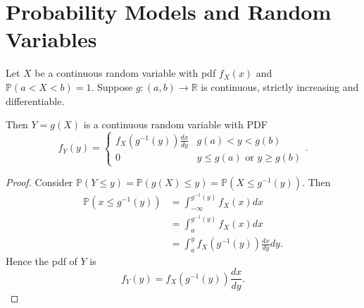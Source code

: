\section{Probability Models and Random Variables}

\begin{theorem}
    Let $X$ be a continuous random variable with pdf $f_X(x)$ and $\mathbb{P}(a < X < b) = 1$. Suppose $g: (a, b) \rightarrow \mathbb{R}$ is continuous, strictly increasing and differentiable.

    Then $Y = g(X)$ is a continuous random variable with PDF
    \[f_Y(y) = \left\{
    \begin{array}{lr}
      f_X(g^{-1}(y)) \frac{dx}{dy} & g(a) < y < g(b)\\
      0 & y \leq g(a) \text{ or } y \geq g(b)
    \end{array}
\right..\] 
\end{theorem}
\begin{proof}
  Consider $\mathbb{P}(Y \leq y) = \mathbb{P}(g(X) \leq y) = \mathbb{P}(X \leq g^{-1}(y) )$. Then
  \begin{align*}
    \mathbb{P}(x \leq g^{-1}(y)) &= \int_{-\infty}^{g^{-1}(y)} f_X(x) dx \\
                                 &= \int_{a}^{g^{-1}(y)} f_X(x) dx  \\
                                 &= \int_{a}^{y} f_X(g^{-1}(y)) \frac{dx}{dy} dy 
  .\end{align*}
  Hence the pdf of $Y$ is 
  \[f_Y(y) = f_X(g^{-1}(y)) \frac{dx}{dy}.\]
\end{proof}
